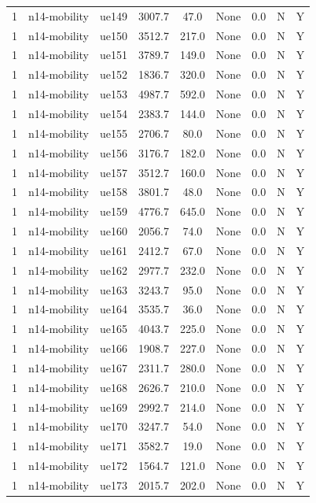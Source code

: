 \begin{table}[ht]
\begin{tabular}{|c|c|c|c|c|c|c|c|c|}
1 & n14-mobility & ue149 & 3007.7 & 47.0 & None & 0.0 & N & Y \\
1 & n14-mobility & ue150 & 3512.7 & 217.0 & None & 0.0 & N & Y \\
1 & n14-mobility & ue151 & 3789.7 & 149.0 & None & 0.0 & N & Y \\
1 & n14-mobility & ue152 & 1836.7 & 320.0 & None & 0.0 & N & Y \\
1 & n14-mobility & ue153 & 4987.7 & 592.0 & None & 0.0 & N & Y \\
1 & n14-mobility & ue154 & 2383.7 & 144.0 & None & 0.0 & N & Y \\
1 & n14-mobility & ue155 & 2706.7 & 80.0 & None & 0.0 & N & Y \\
1 & n14-mobility & ue156 & 3176.7 & 182.0 & None & 0.0 & N & Y \\
1 & n14-mobility & ue157 & 3512.7 & 160.0 & None & 0.0 & N & Y \\
1 & n14-mobility & ue158 & 3801.7 & 48.0 & None & 0.0 & N & Y \\
1 & n14-mobility & ue159 & 4776.7 & 645.0 & None & 0.0 & N & Y \\
1 & n14-mobility & ue160 & 2056.7 & 74.0 & None & 0.0 & N & Y \\
1 & n14-mobility & ue161 & 2412.7 & 67.0 & None & 0.0 & N & Y \\
1 & n14-mobility & ue162 & 2977.7 & 232.0 & None & 0.0 & N & Y \\
1 & n14-mobility & ue163 & 3243.7 & 95.0 & None & 0.0 & N & Y \\
1 & n14-mobility & ue164 & 3535.7 & 36.0 & None & 0.0 & N & Y \\
1 & n14-mobility & ue165 & 4043.7 & 225.0 & None & 0.0 & N & Y \\
1 & n14-mobility & ue166 & 1908.7 & 227.0 & None & 0.0 & N & Y \\
1 & n14-mobility & ue167 & 2311.7 & 280.0 & None & 0.0 & N & Y \\
1 & n14-mobility & ue168 & 2626.7 & 210.0 & None & 0.0 & N & Y \\
1 & n14-mobility & ue169 & 2992.7 & 214.0 & None & 0.0 & N & Y \\
1 & n14-mobility & ue170 & 3247.7 & 54.0 & None & 0.0 & N & Y \\
1 & n14-mobility & ue171 & 3582.7 & 19.0 & None & 0.0 & N & Y \\
1 & n14-mobility & ue172 & 1564.7 & 121.0 & None & 0.0 & N & Y \\
1 & n14-mobility & ue173 & 2015.7 & 202.0 & None & 0.0 & N & Y \\

\end{tabular}
\end{table}
